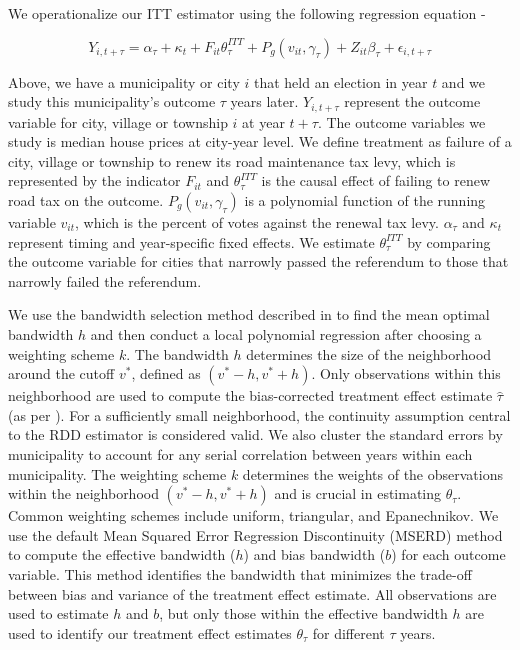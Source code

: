 We operationalize our ITT estimator using the following regression equation -

$$
Y_{i,t+\tau} = \alpha_\tau + \kappa_t + F_{it} \theta_{\tau}^{ITT} + P_g (v_{it}, \gamma_\tau) + Z_{it} \beta_\tau + \epsilon_{i,t + \tau}
$$

Above, we have a municipality or city $i$ that held an election in year $t$ and we study this municipality's outcome $\tau$ years later. $Y_{i,t+\tau}$ represent the outcome variable for city, village or township $i$ at year $t + \tau$. The outcome variables we study is median house prices at city-year level. We define treatment as failure of a city, village or township to renew its road maintenance tax levy, which is represented by the indicator $F_{it}$ and $\theta_{\tau}^{ITT}$ is the causal effect of failing to renew road tax on the outcome. $P_g (v_{it}, \gamma_\tau)$ is a polynomial function of the running variable $v_{it}$, which is the percent of votes against the renewal tax levy. $\alpha_\tau$ and $\kappa_t$ represent timing and year-specific fixed effects. We estimate $\theta_{\tau}^{ITT}$ by comparing the outcome variable for cities that narrowly passed the referendum to those that narrowly failed the referendum.        


We use the bandwidth selection method described in \cite{calonico2019regression} to find the mean optimal bandwidth $h$ and then conduct a local polynomial regression after choosing a weighting scheme $k$. The bandwidth $h$ determines the size of the neighborhood around the cutoff $v^*$, defined as $(v^* - h, v^* + h)$. Only observations within this neighborhood are used to compute the bias-corrected treatment effect estimate $\hat{\tau}$ (as per \cite{calonico2019regression}). For a sufficiently small neighborhood, the continuity assumption central to the RDD estimator is considered valid. We also cluster the standard errors by municipality to account for any serial correlation between years within each municipality. The weighting scheme $k$ determines the weights of the observations within the neighborhood $(v^* - h, v^* + h)$ and is crucial in estimating $\theta_{\tau}$. Common weighting schemes include uniform, triangular, and Epanechnikov. We use the default Mean Squared Error Regression Discontinuity (MSERD) method to compute the effective bandwidth ($h$) and bias bandwidth ($b$) for each outcome variable. This method identifies the bandwidth that minimizes the trade-off between bias and variance of the treatment effect estimate. All observations are used to estimate $h$ and $b$, but only those within the effective bandwidth $h$ are used to identify our treatment effect estimates $\theta_\tau$ for different $\tau$ years.

